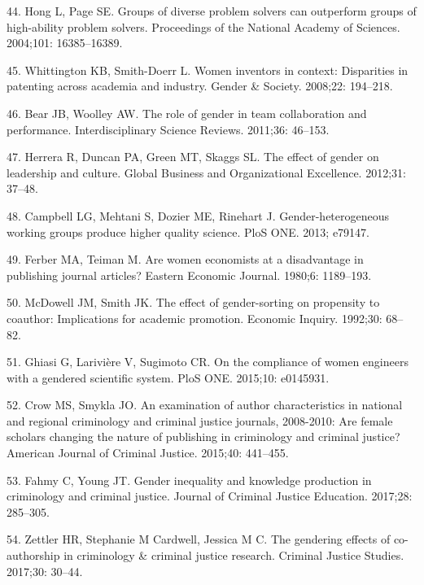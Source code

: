 \documentclass[12pt,]{article}
\begin{document}
\hypertarget{ref-Hong_2004}{}
44. Hong L, Page SE. Groups of diverse problem solvers can outperform
groups of high-ability problem solvers. Proceedings of the National
Academy of Sciences. 2004;101: 16385--16389.

\hypertarget{ref-Whittington_2008}{}
45. Whittington KB, Smith-Doerr L. Women inventors in context:
Disparities in patenting across academia and industry. Gender \&
Society. 2008;22: 194--218.

\hypertarget{ref-Bear_2011}{}
46. Bear JB, Woolley AW. The role of gender in team collaboration and
performance. Interdisciplinary Science Reviews. 2011;36: 46--153.

\hypertarget{ref-Herrera_2012}{}
47. Herrera R, Duncan PA, Green MT, Skaggs SL. The effect of gender on
leadership and culture. Global Business and Organizational Excellence.
2012;31: 37--48.

\hypertarget{ref-Campbell_2013}{}
48. Campbell LG, Mehtani S, Dozier ME, Rinehart J. Gender-heterogeneous
working groups produce higher quality science. PloS ONE. 2013; e79147.

\hypertarget{ref-Ferber_1980}{}
49. Ferber MA, Teiman M. Are women economists at a disadvantage in
publishing journal articles? Eastern Economic Journal. 1980;6:
1189--193.

\hypertarget{ref-McDowell_1992}{}
50. McDowell JM, Smith JK. The effect of gender-sorting on propensity to
coauthor: Implications for academic promotion. Economic Inquiry.
1992;30: 68--82.

\hypertarget{ref-Ghiasi_2015}{}
51. Ghiasi G, Larivière V, Sugimoto CR. On the compliance of women
engineers with a gendered scientific system. PloS ONE. 2015;10:
e0145931.

\hypertarget{ref-Crow_2015}{}
52. Crow MS, Smykla JO. An examination of author characteristics in
national and regional criminology and criminal justice journals,
2008-2010: Are female scholars changing the nature of publishing in
criminology and criminal justice? American Journal of Criminal Justice.
2015;40: 441--455.

\hypertarget{ref-Fahmy_2017}{}
53. Fahmy C, Young JT. Gender inequality and knowledge production in
criminology and criminal justice. Journal of Criminal Justice Education.
2017;28: 285--305.

\hypertarget{ref-Zettler_2017}{}
54. Zettler HR, Stephanie M Cardwell, Jessica M C. The gendering effects
of co-authorship in criminology \& criminal justice research. Criminal
Justice Studies. 2017;30: 30--44.
\end{document}
